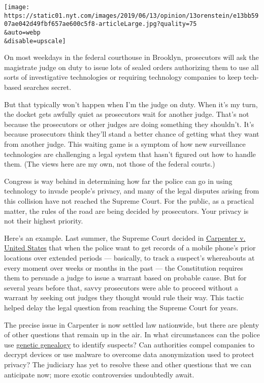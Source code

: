 \texttt{[image: https://static01.nyt.com/images/2019/06/13/opinion/13orenstein/e13bb5907ae042d49fbf657ae600c5f8-articleLarge.jpg?quality=75\\\&auto=webp\\\&disable=upscale]}

On most weekdays in the federal courthouse in Brooklyn, prosecutors will
ask the magistrate judge on duty to issue lots of sealed orders
authorizing them to use all sorts of investigative technologies or
requiring technology companies to keep tech-based searches secret.

But that typically won't happen when I'm the judge on duty. When it's my
turn, the docket gets awfully quiet as prosecutors wait for another
judge. That's not because the prosecutors or other judges are doing
something they shouldn't. It's because prosecutors think they'll stand a
better chance of getting what they want from another judge. This waiting
game is a symptom of how new surveillance technologies are challenging a
legal system that hasn't figured out how to handle them. (The views here
are my own, not those of the federal courts.)

Congress is way behind in determining how far the police can go in using
technology to invade people's privacy, and many of the legal disputes
arising from this collision have not reached the Supreme Court. For the
public, as a practical matter, the rules of the road are being decided
by prosecutors. Your privacy is not their highest priority.

Here's an example. Last summer, the Supreme Court decided in
\href{https://supreme.justia.com/cases/federal/us/585/16-402/}{Carpenter
v. United States} that when the police want to get records of a mobile
phone's prior locations over extended periods --- basically, to track a
suspect's whereabouts at every moment over weeks or months in the past
--- the Constitution requires them to persuade a judge to issue a
warrant based on probable cause. But for several years before that,
savvy prosecutors were able to proceed without a warrant by seeking out
judges they thought would rule their way. This tactic helped delay the
legal question from reaching the Supreme Court for years.

The precise issue in Carpenter is now settled law nationwide, but there
are plenty of other questions that remain up in the air. In what
circumstances can the police use
\href{https://www.nytimes.com/2019/06/11/opinion/police-dna-warrant.html?action=click\&module=Opinion\&pgtype=Homepage}{genetic
genealogy} to identify suspects? Can authorities compel companies to
decrypt devices or use malware to overcome data anonymization used to
protect privacy? The judiciary has yet to resolve these and other
questions that we can anticipate now; more exotic controversies
undoubtedly await.

